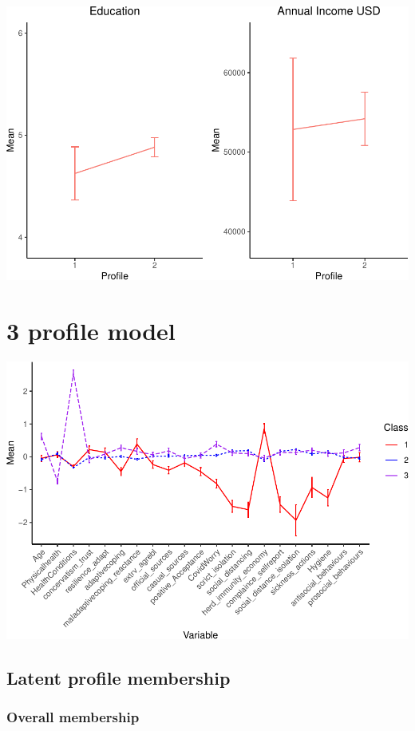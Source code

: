 \documentclass[]{article}
\begin{document}
\includegraphics{lpa_analyses_files/figure-latex/unnamed-chunk-9-1.pdf}

\newpage

\hypertarget{profile-model-1}{%
\section{3 profile model}\label{profile-model-1}}

\includegraphics{lpa_analyses_files/figure-latex/unnamed-chunk-10-1.pdf}

\hypertarget{latent-profile-membership-1}{%
\subsection{Latent profile
membership}\label{latent-profile-membership-1}}

\hypertarget{overall-membership-1}{%
\subsubsection{Overall membership}\label{overall-membership-1}}
\end{document}
